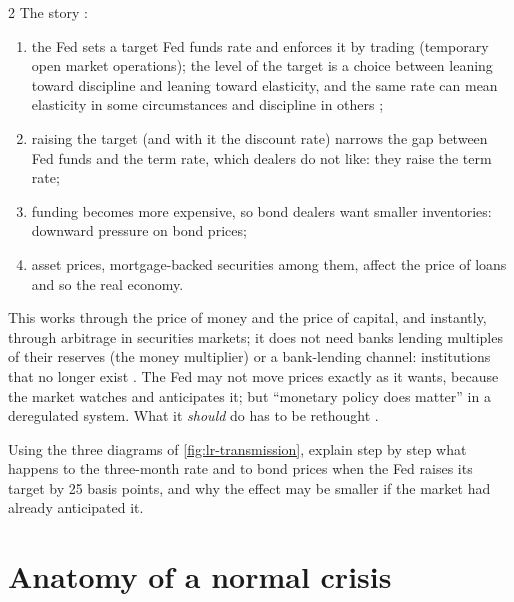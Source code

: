 \begin{paracol}{2}
The story :
\begin{enumerate}
  \item the Fed sets a target Fed funds rate and enforces it by trading (temporary open market operations); the level of the target is a choice between leaning toward
        discipline and leaning toward elasticity, and the same rate can mean elasticity in some circumstances and discipline in others ;
  \item raising the target (and with it the discount rate) narrows the gap between Fed funds and the term rate, which dealers do not like: they raise the term rate;
  \item funding becomes more expensive, so bond dealers want smaller inventories: downward pressure on bond prices;
  \item asset prices, mortgage-backed securities among them, affect the price of loans and so the real economy.
\end{enumerate}
This works through the price of money and the price of capital, and instantly, through arbitrage in securities markets; it does not need banks lending multiples of their
reserves (the money multiplier) or a bank-lending channel: institutions that no longer exist . The Fed may not move prices
exactly as it wants, because the market watches and anticipates it; but ``monetary policy does matter'' in a deregulated system. What it \emph{should} do has to be rethought
.

\begin{exercise}[Transmission]
Using the three diagrams of \cref{fig:lr-transmission}, explain step by step what happens to the three-month rate and to bond prices when the Fed raises its target by 25 basis points,
and why the effect may be smaller if the market had already anticipated it.
\end{exercise}

\section{Anatomy of a normal crisis}\label{sec:lr-normalcrisis}


\end{paracol}
